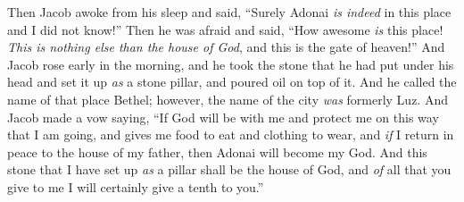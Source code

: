 \begin{biblechapter}
\verse Then Jacob awoke from his sleep and said, “Surely Adonai \textit{is indeed} in this place and I did not know!”
\verse Then he was afraid and said, “How awesome \textit{is} this place! \textit{This is nothing else than the house of God}, and this is the gate of heaven!”
\verse And Jacob rose early in the morning, and he took the stone that he had put under his head and set it up \textit{as} a stone pillar, and poured oil on top of it.
\verse And he called the name of that place Bethel; however, the name of the city \textit{was} formerly Luz.
\verse And Jacob made a vow saying, “If God will be with me and protect me on this way that I am going, and gives me food to eat and clothing to wear,
\verse and \textit{if} I return in peace to the house of my father, then Adonai will become my God.
\verse And this stone that I have set up \textit{as} a pillar shall be the house of God, and \textit{of} all that you give to me I will certainly give a tenth to you.”
\end{biblechapter}

